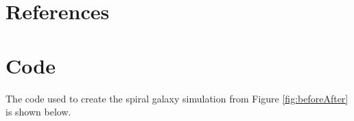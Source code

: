 \documentclass[amsmath,amssymb,reprint,
tightenlines,aps,prl,11pt]{revtex4-1}
\begin{document}
\FloatBarrier

\onecolumngrid
\newpage

\section{References}


\newpage

\section{Code}

The code used to create the spiral galaxy simulation from Figure \ref{fig:beforeAfter} is shown below.



\end{document}
